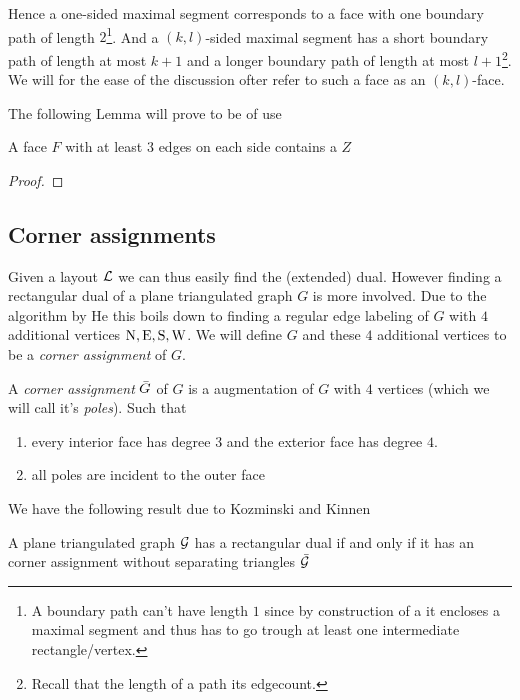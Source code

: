    Hence a one-sided maximal segment corresponds to a face with one boundary path of length $2$\footnote{A boundary path can't have length $1$ since by construction of a \rel it encloses a maximal segment and thus has to go trough at least one intermediate rectangle/vertex.}. And a $(k,l)$-sided maximal segment has a short boundary path of length at most $k+1$ and a longer boundary path of length at most $l+1$\footnote{Recall that the length of a path its edgecount.}.
    We will for the ease of the discussion ofter refer to such a face as an $(k,l)$-face.

    The following Lemma will prove to be of use
    \begin{lemma}
    \label{lm:zInRedFace}
    A face $F$ with at least $3$ edges on each side contains a $Z$
    \end{lemma}
    \begin{proof}
    \end{proof}

\subsection{Corner assignments}
  Given a layout $\mathcal{L}$ we can thus easily find the (extended) dual. However finding a rectangular dual of a plane triangulated graph $G$ is more involved. Due to the algorithm by He \cite{He1993} this boils down to finding a regular edge labeling of $G$ with $4$ additional vertices $\mathrm{N}, \mathrm{E}, \mathrm{S}, \mathrm{W}$. We will define $G$ and these $4$ additional vertices to be a \emph{corner assignment} of $G$.

  \begin{defi}
    A \emph{corner assignment} $\bar{G}$ of $G$ is a augmentation of $G$ with $4$ vertices (which we will call it's \emph{poles}). Such that
    \begin{enumerate}
    \item every interior face has degree $3$ and the exterior face has degree $4$.
    \item all poles are incident to the outer face
    \end{enumerate}
  \end{defi}

  We have the following result due to Kozminski and Kinnen

  \begin{thrm}
    \label{th:rect:exsitenceREctangularDual}
    A plane triangulated graph $\mathcal{G}$ has a rectangular dual if and only if it has an corner assignment without separating triangles $\bar{\mathcal{G}}$
  \end{thrm}

